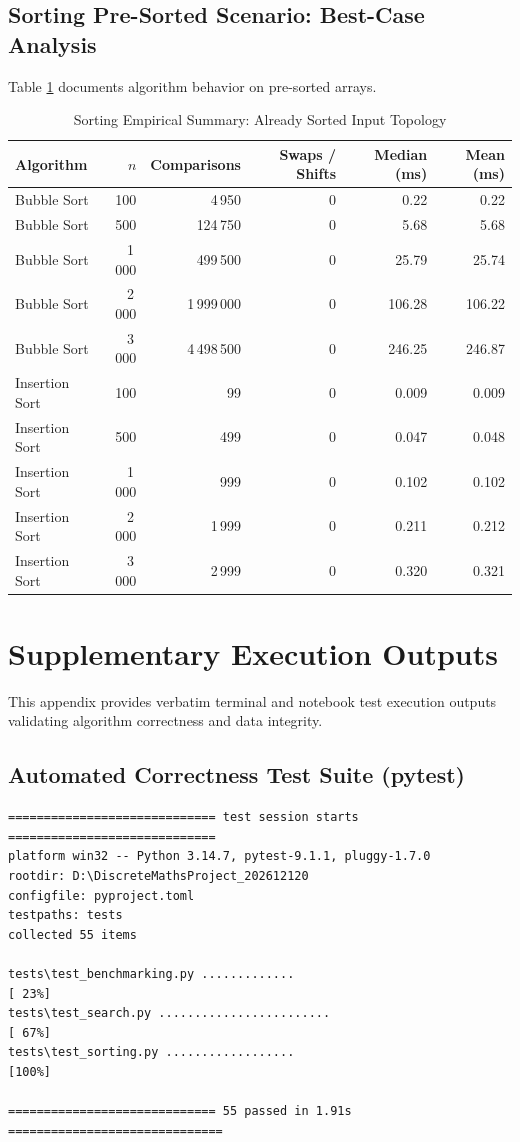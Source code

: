 \documentclass[11pt,a4paper,oneside]{report}
\theoremstyle{definition}
\begin{document}
\section{Sorting Pre-Sorted Scenario: Best-Case Analysis}
Table \ref{tab:sorting_sorted_summary} documents algorithm behavior on pre-sorted arrays.

\begin{table}[htbp]
\centering
\caption{Sorting Empirical Summary: Already Sorted Input Topology}
\label{tab:sorting_sorted_summary}
\small
\begin{tabular*}{\textwidth}{@{\extracolsep{\fill}}lrrrrr}
\toprule
\textbf{Algorithm} & $n$ & \textbf{Comparisons} & \textbf{Swaps / Shifts} & \textbf{Median (ms)} & \textbf{Mean (ms)} \\
\midrule
Bubble Sort & 100 & 4\,950 & 0 & 0.22 & 0.22 \\
Bubble Sort & 500 & 124\,750 & 0 & 5.68 & 5.68 \\
Bubble Sort & 1\,000 & 499\,500 & 0 & 25.79 & 25.74 \\
Bubble Sort & 2\,000 & 1\,999\,000 & 0 & 106.28 & 106.22 \\
Bubble Sort & 3\,000 & 4\,498\,500 & 0 & 246.25 & 246.87 \\
\midrule
Insertion Sort & 100 & 99 & 0 & 0.009 & 0.009 \\
Insertion Sort & 500 & 499 & 0 & 0.047 & 0.048 \\
Insertion Sort & 1\,000 & 999 & 0 & 0.102 & 0.102 \\
Insertion Sort & 2\,000 & 1\,999 & 0 & 0.211 & 0.212 \\
Insertion Sort & 3\,000 & 2\,999 & 0 & 0.320 & 0.321 \\
\bottomrule
\end{tabular*}
\end{table}

\chapter{Supplementary Execution Outputs}
\label{app:outputs}

This appendix provides verbatim terminal and notebook test execution outputs validating algorithm correctness and data integrity.

\section{Automated Correctness Test Suite (pytest)}
\begin{verbatim}
============================= test session starts =============================
platform win32 -- Python 3.14.7, pytest-9.1.1, pluggy-1.7.0
rootdir: D:\DiscreteMathsProject_202612120
configfile: pyproject.toml
testpaths: tests
collected 55 items

tests\test_benchmarking.py .............                                 [ 23%]
tests\test_search.py ........................                            [ 67%]
tests\test_sorting.py ..................                                 [100%]

============================= 55 passed in 1.91s ==============================
\end{verbatim}
\end{document}
